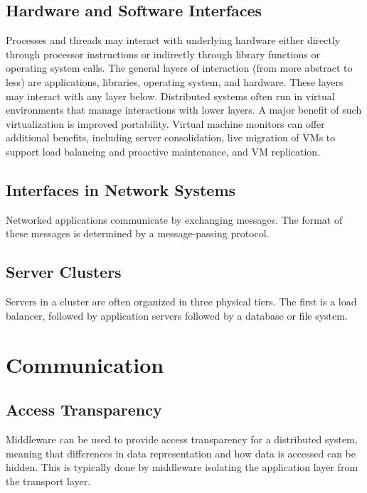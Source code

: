 \documentclass[12pt,titlepage]{article}
\begin{document}
    \subsection{Hardware and Software Interfaces}
      Processes and threads may interact with underlying hardware either directly through processor instructions or indirectly through library functions
      or operating system calls. The general layers of interaction (from more abstract to less) are applications, libraries, operating system, and hardware.
      These layers may interact with any layer below. Distributed systems often run in virtual environments that manage interactions with lower layers.
      A major benefit of such virtualization is improved portability. Virtual machine monitors can offer additional benefits, including server consolidation,
      live migration of VMs to support load balancing and proactive maintenance, and VM replication.

    \subsection{Interfaces in Network Systems}
      Networked applications communicate by exchanging messages. The format of these messages is determined by a message-passing protocol.

    \subsection{Server Clusters}
      Servers in a cluster are often organized in three physical tiers. The first is a load balancer, followed by application servers followed by a database
      or file system.

  \newpage

  \section{Communication}
    \subsection{Access Transparency}
      Middleware can be used to provide access transparency for a distributed system, meaning that differences in data representation and how data is accessed
      can be hidden. This is typically done by middleware isolating the application layer from the transport layer.
\end{document}
